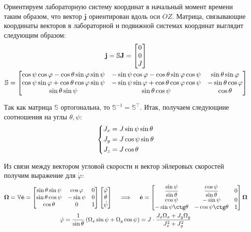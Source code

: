 \documentclass[12pt]{article}
\newcommand{\bbS}{\mathbb{S}}
\newcommand{\bfj}{\mathbf{j}}
\newcommand{\bfJ}{\mathbf{J}}
\begin{document}
Ориентируем лабораторную систему координат в начальный момент времени таким образом, что вектор $\bfj$ ориентирован вдоль оси $OZ$. Матрица, связывающие координаты векторов в лабораторной и подвижной системах координат выглядит следующим образом: 
\begin{gather}
\bfj = \bbS \bfJ = 
\begin{bmatrix}
0 \\
0 \\
J
\end{bmatrix} \notag \\
\bbS = 
\begin{bmatrix} 
\cos \psi \cos \varphi - \cos \theta \sin \varphi \sin \psi & - \sin \psi \cos \varphi - \cos \theta \sin \varphi \cos \psi & \sin \theta \sin \varphi \\ \cos \psi \sin \varphi + \cos \theta \cos \varphi \sin \psi & - \sin \psi \sin \varphi + \cos \theta \cos \varphi \cos \psi & - \sin \theta \cos \varphi \\ \sin \theta \sin \psi & \sin \theta \cos \psi & \cos \theta 
\end{bmatrix} \notag
\end{gather}

Так как матрица $\bbS$ ортогональна, то $\bbS^{-1} = \bbS^\top$. Итак, получаем следующиие соотношения на углы $\theta, \psi$:
\begin{gather}
\left\{
\begin{aligned}
J_x &= J \sin \psi \sin \theta \\
J_y &= J \cos \psi \sin \theta \\
J_z &= J \cos \theta
\end{aligned}
\right. \notag
\end{gather}

Из связи между вектором угловой скорости и вектор эйлеровых скоростей получим выражение для $\dot{\varphi}$:
\begin{gather}
\mathbf{\Omega} = \mathbb{V} \dot{\mathbf{e}} = 
\begin{bmatrix}
\sin \theta \sin \psi & \cos \varphi & 0 \\
\sin \theta \cos \psi & - \sin \psi & 0 \\
\cos \theta & 0 & 1
\end{bmatrix}
\begin{bmatrix}
\dot{\varphi} \\
\dot{\theta} \\
\dot{\psi}
\end{bmatrix} 
\quad \implies \quad
\dot{\mathbf{e}} = 
\begin{bmatrix}
\displaystyle \frac{\sin \psi}{\sin \theta} & \displaystyle \frac{\cos \psi}{\sin \theta} & 0 \\
\cos \psi & - \sin \psi & 0 \\
- \sin \psi \ctg \theta & - \cos \psi \ctg \theta & 1 
\end{bmatrix}
\mathbf{\Omega} \notag \\
\dot{\varphi} = \frac{1}{\sin \theta} \left( \Omega_x \sin \psi + \Omega_y \cos \psi \right) = J \cdot \frac{J_x \Omega_x + J_y \Omega_y}{J_x^2 + J_y^2} \notag
\end{gather}
\end{document}
